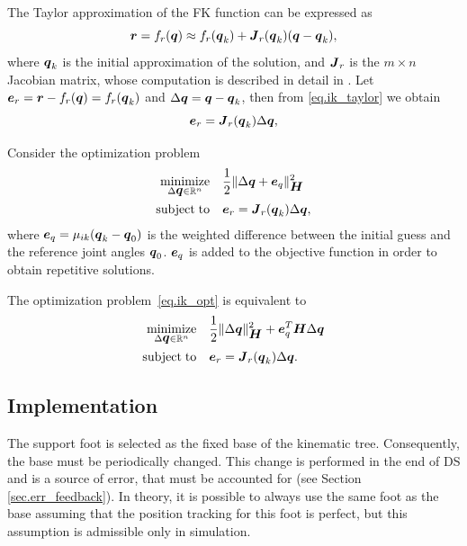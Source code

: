 The Taylor approximation of the \ac{FK} function can be expressed as
\begin{equation}\label{eq.ik_taylor}
\mbm{r} = f_r(\mbm{q}) \approx f_r(\mbm{q}_k) + \mbm{J}_r(\mbm{q}_k)(\mbm{q}-\mbm{q}_k),
\end{equation}
%
where $\mbox{\boldmath $q$}_k$ is the initial approximation of the solution, and $\mbox{\boldmath $J$}_r$ is the
$m \times n$ Jacobian matrix, whose computation is described in detail in 
\cite{AntonioThesis}. Let $\mbox{\boldmath $e$}_r = \mbox{\boldmath $r$} - f_r(\mbox{\boldmath $q$}) = f_r(\mbox{\boldmath $q$}_k)$ 
and $\Delta\mbox{\boldmath $q$} = \mbox{\boldmath $q$}-\mbox{\boldmath $q$}_k$, then from \cref{eq.ik_taylor} we obtain
%
\begin{equation}\label{eq.ik_eqc}
\mbm{e}_r = \mbm{J}_r(\mbm{q}_k)\Delta\mbm{q},
\end{equation}

Consider the optimization problem
\begin{equation}\label{eq.ik_opt}
\begin{split}
\minimize{\Delta\mbm{q} \in \mathbb{R}^n} 
            & \frac{1}{2} \norm{ \Delta\mbm{q} + \mbm{e}_q}^2_{\mbm{H}} \\
\subjectto  & \mbm{e}_r = \mbm{J}_r(\mbm{q}_k)\Delta\mbm{q},
\end{split}
\end{equation}
where $\mbox{\boldmath $e$}_q = \mu_{ik} (\mbox{\boldmath $q$}_k - \mbox{\boldmath $q$}_0)$ is the weighted difference between the 
initial guess and the reference joint angles $\mbox{\boldmath $q$}_0$. $\mbox{\boldmath $e$}_q$ is added to the 
objective function in order to obtain repetitive solutions.

The optimization problem~\eqref{eq.ik_opt} is equivalent to
\begin{equation}\label{eq.ik_opt_final}
\begin{split}
\minimize{\Delta\mbm{q} \in \mathbb{R}^n} 
            & \frac{1}{2} \norm{ \Delta\mbm{q} }^2_{\mbm{H}} + \mbm{e}_q^T \mbm{H} \Delta\mbm{q} \\
\subjectto  & \mbm{e}_r = \mbm{J}_r(\mbm{q}_k)\Delta\mbm{q}.
\end{split}
\end{equation}



\subsection{Implementation}
The support foot is selected as the fixed base of the kinematic tree. Consequently,
the base must be periodically changed. This change is performed in the end of \ac{DS}
and is a source of error, that must be accounted for (see Section 
\cref{sec.err_feedback}). In theory, it is possible to always use the same foot as 
the base assuming that the position tracking for this foot is perfect, but this 
assumption is admissible only in simulation. 

